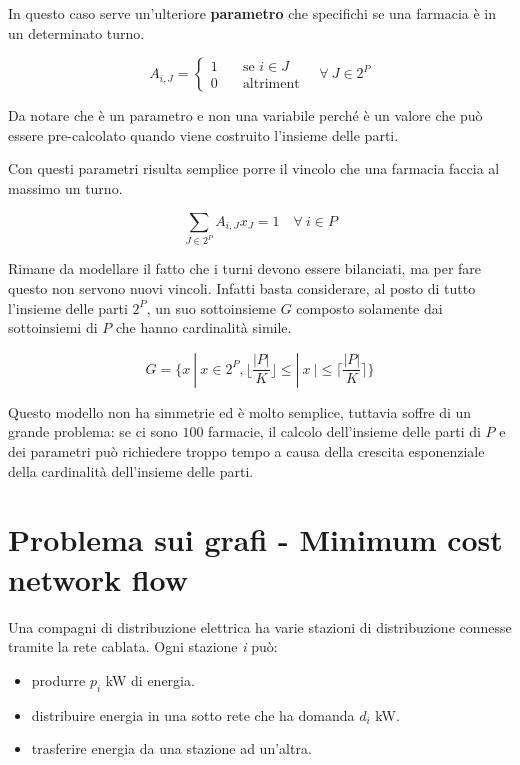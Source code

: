 In questo caso serve un'ulteriore \textbf{parametro} che specifichi se una farmacia è in un determinato turno.

$$
A_{i,J} = \begin{cases}
1 \quad &\text{se } i \in J \\
0 \quad &\text{altriment}
\end{cases} \quad \forall \: J \in 2^P
$$

\noindent Da notare che è un parametro e non una variabile perché è un valore che può essere pre-calcolato quando viene costruito l'insieme delle parti.

Con questi parametri risulta semplice porre il vincolo che una farmacia faccia al massimo un turno.

$$
\sum\limits_{J \in 2^P} A_{i,J} x_J = 1 \quad \forall \: i \in P
$$

\noindent Rimane da modellare il fatto che i turni devono essere bilanciati, ma per fare questo non servono nuovi vincoli. Infatti basta considerare, al posto di tutto l'insieme delle parti $2^P$, un suo sottoinsieme $G$ composto solamente dai sottoinsiemi di $P$ che hanno cardinalità simile.

$$
G = \bigg\{x \:  | \: x \in 2^P, \bigg\lfloor \frac{|P|}{K} \bigg\rfloor \leq |\:x\:|\leq  \bigg\lceil \frac{|P|}{K} \bigg\rceil \bigg\}
$$

\noindent Questo modello non ha simmetrie ed è molto semplice, tuttavia soffre di un grande problema: se ci sono $100$ farmacie, il calcolo dell'insieme delle parti di $P$ e dei parametri può richiedere troppo tempo a causa della crescita esponenziale della cardinalità dell'insieme delle parti.

\section{Problema sui grafi - Minimum cost network flow}

Una compagni di distribuzione elettrica ha varie stazioni di distribuzione connesse tramite la rete cablata. Ogni stazione \textit{i} può:

\begin{itemize}
	\item produrre $p_i$ kW di energia.
	\item distribuire energia in una sotto rete che ha domanda $d_i$ kW.
	\item trasferire energia da una stazione ad un'altra.
\end{itemize}

